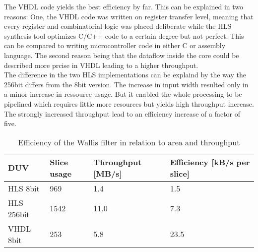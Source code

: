 The VHDL code yields the best efficiency by far. This can be explained in two
reasons: One, the VHDL code was written on register transfer level, meaning that
every register and combinatorial logic was placed deliberate while the HLS
synthesis tool optimizes C/C++ code to a certain degree but not perfect. This
can be compared to writing microcontroller code in either C or assembly
language. The second reason being that the dataflow inside the core could be
described more prcise in VHDL leading to a higher throughput.
\\

The difference in the two HLS implementations can be explaind by the way the
256bit differs from the 8bit version. The increase in input width resulted only
in a minor increase in ressource usage. But it enabled the whole processing to be
pipelined which requires little more resources but yields high throughput
increase. The strongly increased throughput lead to an efficiency increase of a
factor of five.
\\

\begin{table}[h!]
    \centering
    \begin{tabular}{l l l l}
        \toprule
        DUV         & Slice usage & Throughput [MB/s] & Efficiency [kB/s per
        slice]\\
        \midrule
        HLS  8bit    &  969          & 1.4               & 1.5   \\
        HLS  256bit  &  1542         & 11.0              & 7.3   \\
        VHDL 8bit    &  253          & 5.8               & 23.5  \\
        \bottomrule
    \end{tabular}
    \caption{Efficiency of the Wallis filter in relation to area and throughput}
    \label{tab:efficiency}
\end{table}






